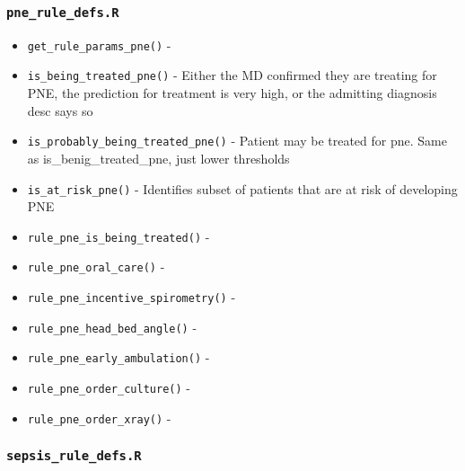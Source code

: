 \documentclass[
]{book}
\providecommand{\tightlist}{%
  \setlength{\itemsep}{0pt}\setlength{\parskip}{0pt}}
\begin{document}
\hypertarget{pne_rule_defs.r-1}{%
\subsubsection{\texorpdfstring{\texttt{pne\_rule\_defs.R}}{pne\_rule\_defs.R}}\label{pne_rule_defs.r-1}}

\begin{itemize}
\tightlist
\item
  \texttt{get\_rule\_params\_pne()} -
\item
  \texttt{is\_being\_treated\_pne()} - Either the MD confirmed they are treating for PNE, the prediction for treatment is very high, or the admitting diagnosis desc says so
\item
  \texttt{is\_probably\_being\_treated\_pne()} - Patient may be treated for pne. Same as is\_benig\_treated\_pne, just lower thresholds
\item
  \texttt{is\_at\_risk\_pne()} - Identifies subset of patients that are at risk of developing PNE
\item
  \texttt{rule\_pne\_is\_being\_treated()} -
\item
  \texttt{rule\_pne\_oral\_care()} -
\item
  \texttt{rule\_pne\_incentive\_spirometry()} -
\item
  \texttt{rule\_pne\_head\_bed\_angle()} -
\item
  \texttt{rule\_pne\_early\_ambulation()} -
\item
  \texttt{rule\_pne\_order\_culture()} -
\item
  \texttt{rule\_pne\_order\_xray()} -
\end{itemize}

\hypertarget{sepsis_rule_defs.r-1}{%
\subsubsection{\texorpdfstring{\texttt{sepsis\_rule\_defs.R}}{sepsis\_rule\_defs.R}}\label{sepsis_rule_defs.r-1}}
\end{document}
